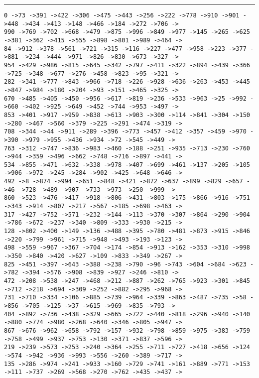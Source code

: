 \documentclass[letter, 12pt]{article}
\newenvironment{question}[1]{%
    \vspace{.2in}%
        \noindent{\bf #1}%
    \vspace{0.3em} \hrule \vspace{.1in}%
}{}
\begin{document}
\begin{question}{\large Appendix}
\begin{lstlisting}[style=CStyle]
0 ->73 ->391 ->422 ->306 ->475 ->443 ->256 ->222 ->778 ->910 ->901 ->448 ->434 ->413 ->148 ->466 ->184 ->272 ->706 ->
990 ->769 ->702 ->668 ->479 ->875 ->996 ->849 ->977 ->145 ->265 ->625 ->381 ->362 ->415 ->555 ->898 ->801 ->989 ->464 ->
84 ->912 ->378 ->561 ->721 ->315 ->116 ->227 ->477 ->958 ->223 ->377 ->881 ->234 ->444 ->971 ->826 ->830 ->673 ->327 ->
954 ->429 ->986 ->815 ->645 ->342 ->797 ->411 ->322 ->894 ->439 ->366 ->725 ->348 ->677 ->276 ->458 ->823 ->95 ->321 ->
282 ->341 ->777 ->843 ->966 ->718 ->226 ->928 ->636 ->263 ->453 ->445 ->847 ->984 ->180 ->204 ->93 ->151 ->465 ->325 ->
670 ->485 ->405 ->450 ->956 ->617 ->819 ->236 ->533 ->963 ->25 ->992 ->660 ->402 ->925 ->649 ->452 ->744 ->953 ->497 ->
853 ->401 ->917 ->959 ->838 ->613 ->903 ->300 ->114 ->841 ->304 ->150 ->280 ->467 ->560 ->379 ->225 ->291 ->474 ->319 ->
708 ->344 ->44 ->911 ->289 ->396 ->773 ->457 ->412 ->357 ->459 ->970 ->390 ->979 ->955 ->436 ->934 ->72 ->545 ->449 ->
763 ->312 ->747 ->836 ->983 ->460 ->188 ->251 ->935 ->713 ->230 ->760 ->944 ->359 ->496 ->662 ->748 ->716 ->897 ->441 ->
534 ->855 ->471 ->632 ->338 ->978 ->407 ->699 ->461 ->137 ->205 ->105 ->906 ->972 ->245 ->284 ->902 ->425 ->648 ->646 ->
492 ->8 ->874 ->994 ->651 ->848 ->421 ->872 ->637 ->899 ->829 ->657 ->46 ->728 ->489 ->907 ->733 ->973 ->250 ->999 ->
860 ->523 ->476 ->417 ->918 ->806 ->431 ->803 ->175 ->866 ->916 ->751 ->343 ->914 ->807 ->217 ->567 ->185 ->698 ->463 ->
317 ->427 ->752 ->571 ->232 ->144 ->113 ->370 ->307 ->864 ->290 ->904 ->786 ->672 ->237 ->340 ->809 ->333 ->930 ->215 ->
128 ->802 ->400 ->149 ->136 ->488 ->395 ->780 ->481 ->873 ->915 ->846 ->220 ->799 ->961 ->715 ->948 ->493 ->193 ->123 ->
498 ->559 ->967 ->367 ->704 ->174 ->854 ->913 ->162 ->353 ->310 ->998 ->350 ->840 ->420 ->627 ->109 ->833 ->349 ->267 ->
825 ->451 ->397 ->643 ->388 ->238 ->790 ->96 ->743 ->604 ->684 ->623 ->782 ->394 ->576 ->908 ->839 ->927 ->246 ->810 ->
472 ->208 ->538 ->247 ->468 ->212 ->887 ->262 ->765 ->923 ->301 ->845 ->712 ->218 ->694 ->309 ->252 ->882 ->295 ->968 ->
731 ->710 ->334 ->106 ->885 ->739 ->964 ->339 ->863 ->487 ->735 ->58 ->856 ->705 ->125 ->37 ->615 ->969 ->835 ->793 ->
404 ->892 ->736 ->438 ->329 ->665 ->722 ->440 ->818 ->296 ->940 ->140 ->880 ->774 ->980 ->268 ->640 ->346 ->805 ->947 ->
867 ->676 ->962 ->658 ->792 ->157 ->932 ->798 ->859 ->975 ->383 ->759 ->758 ->499 ->937 ->753 ->130 ->371 ->837 ->596 ->
219 ->239 ->573 ->253 ->240 ->364 ->255 ->711 ->727 ->418 ->656 ->124 ->574 ->942 ->936 ->993 ->556 ->260 ->389 ->717 ->
135 ->286 ->974 ->241 ->933 ->160 ->729 ->741 ->161 ->889 ->771 ->153 ->111 ->737 ->269 ->568 ->270 ->762 ->435 ->437 ->

\end{lstlisting}
\end{question}
\end{document}
